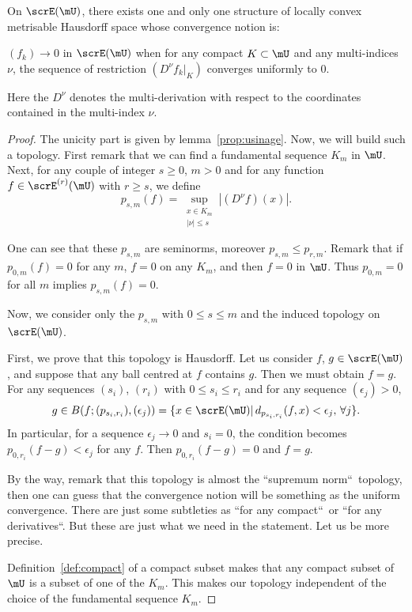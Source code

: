 \begin{proposition}
On $\scrE(\mU)$, there exists one and only one structure of locally convex metrisable Hausdorff space whose convergence notion is:

$(f_k)\to 0$ in $\scrE(\mU)$ when for any compact $K\subset\mU$ and any multi-indices $\nu$, the sequence of restriction $(D^{\nu}f_k|_K)$ converges uniformly to $0$.

Here the $D^{\nu}$ denotes the multi-derivation with respect to the coordinates contained in the multi-index $\nu$.
\label{prop:topo_E}
\end{proposition}
\begin{proof}
 The unicity part is given by lemma~\ref{prop:usinage}. Now, we will build such a topology. First remark that we can find a fundamental sequence $K_m$ in $\mU$. Next, for any couple of integer $s\geq 0$, $m>0$ and for any function $f\in\scrE^{(r)}(\mU)$ with $r\geq s$, we define
\[
   p_{s,m}(f)=\sup_{\substack{ x\in K_m\\|\nu|\leq s}}|(D^{\nu}f)(x)|.
\]

One can see that these $p_{s,m}$ are seminorms, moreover $p_{s,m}\leq p_{r,m}$. Remark that if $p_{0,m}(f)=0$ for any $m$, $f=0$ on any $K_m$, and then $f=0$ in $\mU$. Thus $p_{0,m}=0$ for all $m$ implies $p_{s,m}(f)=0$.

Now, we consider only the $p_{s,m}$ with $0\leq s\leq m$ and the induced topology on $\scrE(\mU)$.

First, we prove that this topology is Hausdorff. Let us consider $f$, $g\in\scrE(\mU)$, and suppose that any ball centred at $f$ contains $g$. Then we must obtain $f=g$. For any sequences $(s_i)$, $(r_i)$ with $0\leq s_i\leq r_i$ and for any sequence $(\epsilon_j)>0$,
\[
  g\in B(f;(p_{s_i,r_i}),(\epsilon_j))=
          \{ x\in\scrE(\mU)|\, d_{p_{s_i,r_i}}(f,x)<\epsilon_j,\,\forall j \}.
\]
In particular, for a sequence $\epsilon_j\to 0$ and $s_i=0$, the condition becomes $p_{0,r_i}(f-g)<\epsilon_j$ for any $f$. Then $p_{0,r_i}(f-g)=0$ and $f=g$.

By the way, remark that this topology is almost the ``supremum norm``\ topology, then one can guess that the convergence notion will be something as the uniform convergence. There are just some subtleties as ``for any compact``\ or ``for any derivatives``. But these are just what we need in the statement. Let us be more precise.

Definition~\ref{def:compact} of a compact subset makes that any compact subset of $\mU$ is a subset of one of the $K_m$. This makes our topology independent of the choice of the fundamental sequence $K_m$.


\end{proof}
